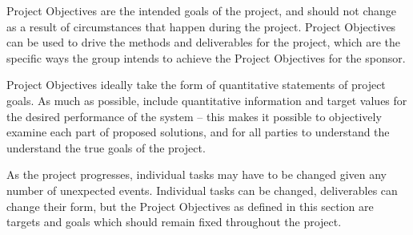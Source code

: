Project Objectives are the intended goals of the project, and should not change as a result of circumstances that happen during the project.   Project Objectives can be used to drive the methods and deliverables for the project, which are the specific ways the group intends to achieve the Project Objectives for the sponsor.

Project Objectives ideally take the form of quantitative statements of project goals.  As much as possible, include quantitative information and target values for the desired performance of the system – this makes it possible to objectively examine each part of proposed solutions, and for all parties to understand the understand the true goals of the project.

As the project progresses, individual tasks may have to be changed given any number of unexpected events. Individual tasks can be changed, deliverables can change their form, but the Project Objectives as defined in this section are targets and goals which should remain fixed throughout the project.
